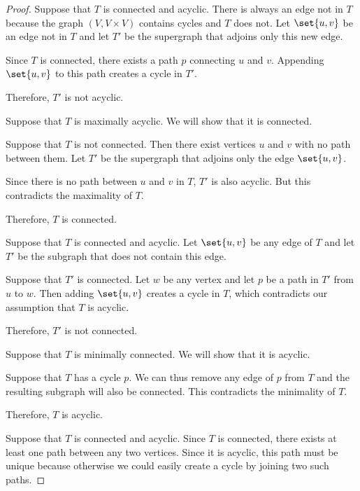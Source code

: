 \begin{proof}
   Suppose that \( T \) is connected and acyclic. There is always an edge not in \( T \) because the graph \( (V, V \times V) \) contains cycles and \( T \) does not. Let \( \set{ u, v } \) be an edge not in \( T \) and let \( T' \) be the supergraph that adjoins only this new edge.

  Since \( T \) is connected, there exists a path \( p \) connecting \( u \) and \( v \). Appending \( \set{ u, v } \) to this path creates a cycle in \( T' \).

  Therefore, \( T' \) is not acyclic.

   Suppose that \( T \) is maximally acyclic. We will show that it is connected.

  Suppose that \( T \) is not connected. Then there exist vertices \( u \) and \( v \) with no path between them. Let \( T' \) be the supergraph that adjoins only the edge \( \set{ u, v } \).

  Since there is no path between \( u \) and \( v \) in \( T \), \( T' \) is also acyclic. But this contradicts the maximality of \( T \).

  Therefore, \( T \) is connected.

   Suppose that \( T \) is connected and acyclic. Let \( \set{ u, v } \) be any edge of \( T \) and let \( T' \) be the subgraph that does not contain this edge.

  Suppose that \( T' \) is connected. Let \( w \) be any vertex and let \( p \) be a path in \( T' \) from \( u \) to \( w \). Then adding \( \set{ u, v } \) creates a cycle in \( T \), which contradicts our assumption that \( T \) is acyclic.

  Therefore, \( T' \) is not connected.

   Suppose that \( T \) is minimally connected. We will show that it is acyclic.

  Suppose that \( T \) has a cycle \( p \). We can thus remove any edge of \( p \) from \( T \) and the resulting subgraph will also be connected. This contradicts the minimality of \( T \).

  Therefore, \( T \) is acyclic.

   Suppose that \( T \) is connected and acyclic. Since \( T \) is connected, there exists at least one path between any two vertices. Since it is acyclic, this path must be unique because otherwise we could easily create a cycle by joining two such paths.


\end{proof}
